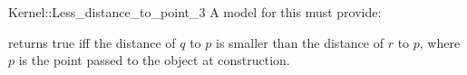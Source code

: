 \begin{ccRefFunctionObjectConcept}{Kernel::Less_distance_to_point_3}
A model for this must provide:


{}
 
{returns true iff the distance of $q$ to $p$ is
smaller than the distance of $r$ to $p$, where $p$ is the point
passed to the object at construction.}

\end{ccRefFunctionObjectConcept}
